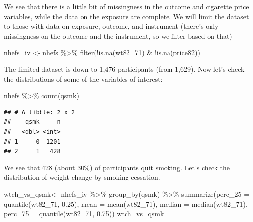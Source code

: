 \documentclass[
]{book}
\newenvironment{Shaded}{\begin{snugshade}}{\end{snugshade}}
\newcommand{\AttributeTok}[1]{\textcolor[rgb]{0.77,0.63,0.00}{#1}}
\newcommand{\FloatTok}[1]{\textcolor[rgb]{0.00,0.00,0.81}{#1}}
\newcommand{\FunctionTok}[1]{\textcolor[rgb]{0.00,0.00,0.00}{#1}}
\newcommand{\NormalTok}[1]{#1}
\newcommand{\OtherTok}[1]{\textcolor[rgb]{0.56,0.35,0.01}{#1}}
\newcommand{\SpecialCharTok}[1]{\textcolor[rgb]{0.00,0.00,0.00}{#1}}
\begin{document}
We see that there is a little bit of missingness in the outcome and cigarette price variables, while the data on the exposure are complete. We will limit the dataset to those with data on exposure, outcome, and instrument (there's only missingness on the outcome and the instrument, so we filter based on that)

\begin{Shaded}
\begin{Highlighting}[]
\NormalTok{nhefs\_iv }\OtherTok{\textless{}{-}}\NormalTok{ nhefs }\SpecialCharTok{\%\textgreater{}\%}
  \FunctionTok{filter}\NormalTok{(}\SpecialCharTok{!}\FunctionTok{is.na}\NormalTok{(wt82\_71) }\SpecialCharTok{\&} \SpecialCharTok{!}\FunctionTok{is.na}\NormalTok{(price82))}
\end{Highlighting}
\end{Shaded}

The limited dataset is down to 1,476 participants (from 1,629). Now let's check the distributions of some of the variables of interest:

\begin{Shaded}
\begin{Highlighting}[]
\NormalTok{nhefs }\SpecialCharTok{\%\textgreater{}\%} 
  \FunctionTok{count}\NormalTok{(qsmk) }
\end{Highlighting}
\end{Shaded}

\begin{verbatim}
## # A tibble: 2 x 2
##    qsmk     n
##   <dbl> <int>
## 1     0  1201
## 2     1   428
\end{verbatim}

We see that 428 (about 30\%) of participants quit smoking. Let's check the distribution of weight change by smoking cessation.

\begin{Shaded}
\begin{Highlighting}[]
\NormalTok{wtch\_vs\_qsmk}\OtherTok{\textless{}{-}}\NormalTok{ nhefs\_iv }\SpecialCharTok{\%\textgreater{}\%} 
  \FunctionTok{group\_by}\NormalTok{(qsmk) }\SpecialCharTok{\%\textgreater{}\%} 
  \FunctionTok{summarize}\NormalTok{(}\AttributeTok{perc\_25 =} \FunctionTok{quantile}\NormalTok{(wt82\_71, }\FloatTok{0.25}\NormalTok{), }
            \AttributeTok{mean =} \FunctionTok{mean}\NormalTok{(wt82\_71), }
            \AttributeTok{median =} \FunctionTok{median}\NormalTok{(wt82\_71),}
            \AttributeTok{perc\_75 =} \FunctionTok{quantile}\NormalTok{(wt82\_71, }\FloatTok{0.75}\NormalTok{))}
\NormalTok{wtch\_vs\_qsmk}
\end{Highlighting}
\end{Shaded}
\end{document}
